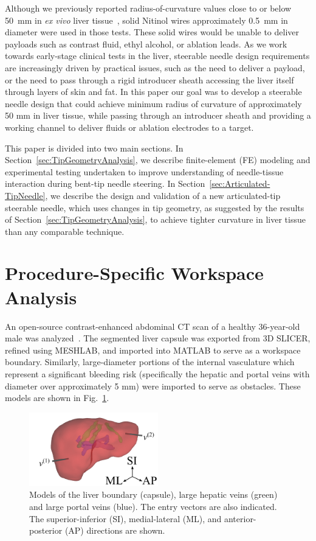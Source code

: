 Although we previously reported radius-of-curvature values close to or below 50~mm in \textit{ex vivo} liver tissue~\cite{Adebar2014,Majewicz2010}, solid Nitinol wires approximately 0.5~mm in diameter were used in those tests. These solid wires would be unable to deliver payloads such as contrast fluid, ethyl alcohol, or ablation leads. As we work towards early-stage clinical tests in the liver, steerable needle design requirements are increasingly driven by practical issues, such as the need to deliver a payload, or the need to pass through a rigid introducer sheath accessing the liver itself through layers of skin and fat. In this paper our goal was to develop a steerable needle design that could achieve minimum radius of curvature of approximately 50 mm in liver tissue, while passing through an introducer sheath and providing a working channel to deliver fluids or ablation electrodes to a target.
 
This paper is divided into two main sections. In Section~\ref{sec:TipGeometryAnalysis}, we describe finite-element (FE) modeling and experimental testing undertaken to improve understanding of needle-tissue interaction during bent-tip needle steering. In Section~\ref{sec:Articulated-TipNeedle}, we describe the design and validation of a new articulated-tip steerable needle, which uses changes in tip geometry, as suggested by the results of Section~\ref{sec:TipGeometryAnalysis}, to achieve tighter curvature in liver tissue than any comparable technique.

\section{Procedure-Specific Workspace Analysis}
An open-source contrast-enhanced abdominal CT scan of a healthy 36-year-old male was analyzed~\cite{Pieper2004}. The segmented liver capsule was exported from 3D SLICER, refined using MESHLAB, and imported into MATLAB to serve as a workspace boundary. Similarly, large-diameter portions of the internal vasculature which represent a significant bleeding risk (specifically the hepatic and portal veins with diameter over approximately 5 mm) were imported to serve as obstacles. These models are shown in Fig.~\ref{fig:Meshes3D}. 

\begin{figure}[!t]
\centering
\includegraphics[width = 0.5\textwidth]{Images/Chapter3/Meshes3D/Meshes3D}%
\caption[Models of the liver anatomy]{Models of the liver boundary (capsule), large hepatic veins (green) and large portal veins (blue). The entry vectors are also indicated. The superior-inferior (SI), medial-lateral (ML), and anterior-posterior (AP) directions are shown.}
\label{fig:Meshes3D}
\end{figure}

